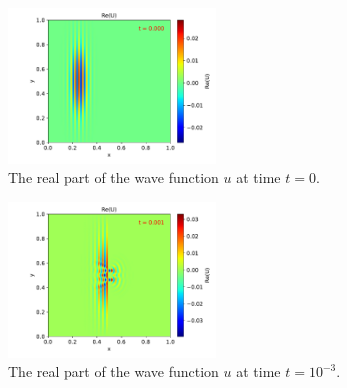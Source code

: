 \documentclass[english,notitlepage,reprint,nofootinbib]{revtex4-2}  %
\begin{document}
	\begin{figure}[H]
		\centering
		\includegraphics[trim={1cm 0cm 1cm 0cm},clip,width=0.49\textwidth]{figures/problem8_U_Re_0.000.pdf}
		\caption{The real part of the wave function $u$ at time $t = 0$.}
		\label{fig:prob8_Re0}
	\end{figure}

	\begin{figure}[h!]
		\centering
		\includegraphics[trim={1cm 0cm 1cm 0cm},clip,width=0.49\textwidth]{figures/problem8_U_Re_0.001.pdf}
		\caption{The real part of the wave function $u$ at time $t = 10^{-3}$.}
		\label{fig:prob8_Re1}
	\end{figure}
\end{document}
